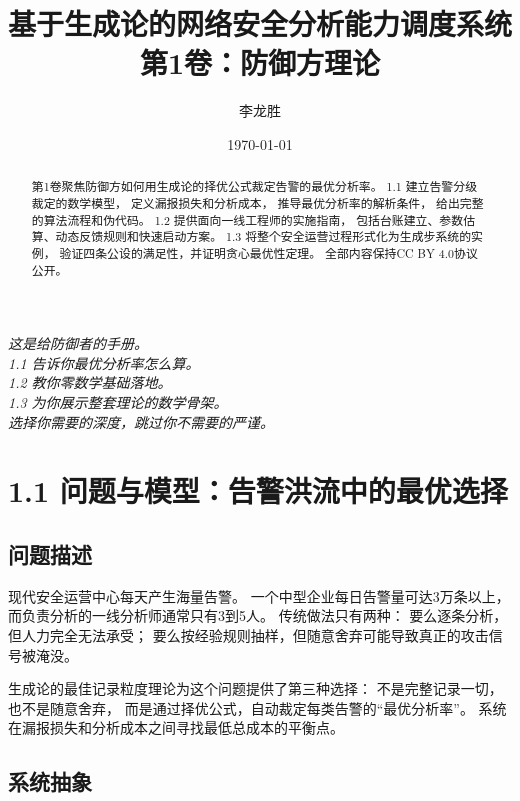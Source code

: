 \documentclass[11pt,a4paper]{article}
\title{基于生成论的网络安全分析能力调度系统\\
第1卷：防御方理论}
\author{李龙胜}
\date{\today}
\begin{document}
\maketitle

\begin{center}
\textit{
这是给防御者的手册。\\
1.1 告诉你最优分析率怎么算。\\
1.2 教你零数学基础落地。\\
1.3 为你展示整套理论的数学骨架。\\
选择你需要的深度，跳过你不需要的严谨。
}
\end{center}

\vspace{5mm}

\begin{abstract}
第1卷聚焦防御方如何用生成论的择优公式裁定告警的最优分析率。
1.1 建立告警分级裁定的数学模型，
定义漏报损失和分析成本，
推导最优分析率的解析条件，
给出完整的算法流程和伪代码。
1.2 提供面向一线工程师的实施指南，
包括台账建立、参数估算、动态反馈规则和快速启动方案。
1.3 将整个安全运营过程形式化为生成步系统的实例，
验证四条公设的满足性，并证明贪心最优性定理。
全部内容保持CC BY 4.0协议公开。
\end{abstract}

\tableofcontents

\section{1.1 问题与模型：告警洪流中的最优选择}

\subsection{问题描述}

现代安全运营中心每天产生海量告警。
一个中型企业每日告警量可达3万条以上，
而负责分析的一线分析师通常只有3到5人。
传统做法只有两种：
要么逐条分析，但人力完全无法承受；
要么按经验规则抽样，但随意舍弃可能导致真正的攻击信号被淹没。

生成论的最佳记录粒度理论为这个问题提供了第三种选择：
不是完整记录一切，也不是随意舍弃，
而是通过择优公式，自动裁定每类告警的“最优分析率”。
系统在漏报损失和分析成本之间寻找最低总成本的平衡点。

\subsection{系统抽象}
\end{document}
